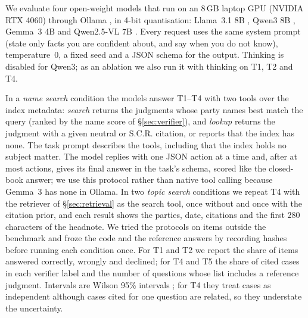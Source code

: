\documentclass[conference]{IEEEtran}
\begin{document}
We evaluate four open-weight models that run on an 8\,GB laptop GPU (NVIDIA RTX 4060) through Ollama \cite{ollama}, in 4-bit quantisation: Llama~3.1 8B \cite{llama3}, Qwen3 8B \cite{qwen3}, Gemma~3 4B \cite{gemma3} and Qwen2.5-VL 7B \cite{qwen25vl}. Every request uses the same system prompt (state only facts you are confident about, and say when you do not know), temperature~0, a fixed seed and a JSON schema for the output. Thinking is disabled for Qwen3; as an ablation we also run it with thinking on T1, T2 and T4.

In a \emph{name search} condition the models answer T1--T4 with two tools over the index metadata: \emph{search} returns the \SearchK{} judgments whose party names best match the query (ranked by the name score of \S\ref{sec:verifier}), and \emph{lookup} returns the judgment with a given neutral or S.C.R. citation, or reports that the index has none. The task prompt describes the tools, including that the index holds no subject matter. The model replies with one JSON action at a time and, after at most \SearchMaxActions{} actions, gives its final answer in the task's schema, scored like the closed-book answer; we use this protocol rather than native tool calling because Gemma~3 has none in Ollama. In two \emph{topic search} conditions we repeat T4 with the retriever of \S\ref{sec:retrieval} as the search tool, once without and once with the citation prior, and each result shows the parties, date, citations and the first 280 characters of the headnote. We tried the protocols on items outside the benchmark and froze the code and the reference answers by recording hashes before running each condition once. For T1 and T2 we report the share of items answered correctly, wrongly and declined; for T4 and T5 the share of cited cases in each verifier label and the number of questions whose list includes a reference judgment. Intervals are Wilson 95\% intervals \cite{wilson}; for T4 they treat cases as independent although cases cited for one question are related, so they understate the uncertainty.
\end{document}
